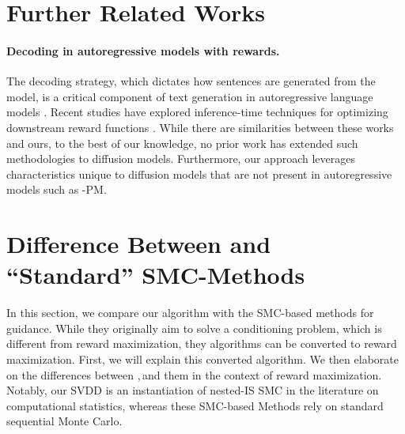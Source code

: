 

\newpage 
\appendix 
\section{Further Related Works}\label{sec:more_related_works}




\paragraph{Decoding in autoregressive models with rewards.} 

The decoding strategy, which dictates how sentences are generated from the model, is a critical component of text generation in autoregressive language models \citep{wu2016google,chorowski2016towards,leblond2021machine}.  Recent studies have explored inference-time techniques for optimizing downstream reward functions \citet{dathathri2019plug,yang2021fudge,qin2022cold,mudgal2023controlled,zhao2024probabilistic,han2024value}. While there are similarities between these works and ours, to the best of our knowledge, no prior work has extended such methodologies to diffusion models. Furthermore, our approach leverages characteristics unique to diffusion models that are not present in autoregressive models such as \alg-PM.






\section{Difference Between {\alg} and ``Standard'' SMC-Methods}\label{sec:filter}




 
{ In this section, we compare our algorithm with the SMC-based methods \citep{wu2024practical,trippe2022diffusion,dou2024diffusion,phillips2024particle,cardoso2023monte} for guidance. While they originally aim to solve a conditioning problem, which is different from reward maximization, they algorithms can be converted to reward maximization. First, we will explain this converted algorithm. We then elaborate on the differences between \alg,\,and them in the context of reward maximization. Notably, our SVDD is an instantiation of nested-IS SMC \citep[Algorithm 5]{naesseth2019elements} in the literature on computational statistics, whereas these SMC-based Methods rely on standard sequential Monte Carlo.
} 

